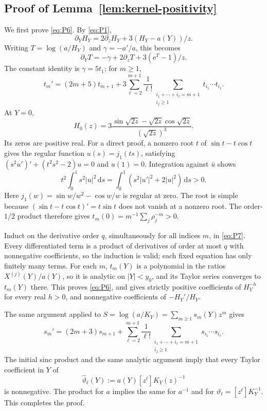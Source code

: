 \subsection{Proof of Lemma~\ref{lem:kernel-positivity}}\label{app:kernel-positivity}

We first prove \eqref{eq:P6}. By \eqref{eq:P1}, \[
 \partial_YH_Y=2\partial_zH_Y+3(H_Y-a(Y))/z.
\] Writing \(T=\log(a/H_Y)\) and \(\gamma=-a'/a\), this becomes \[
 \partial_YT=-\gamma+2\partial_zT+3(\mathrm{e}^T-1)/z.
\] The constant identity is \(\gamma=5t_1\); for \(m\ge1\), \begin{equation}
t_m'=(2m+5)t_{m+1}
  +3\sum_{\ell=2}^{m+1}\frac1{\ell!}
       \sum_{\substack{i_1+\cdots+i_\ell=m+1\\ i_j\ge1}}
          t_{i_1}\cdots t_{i_\ell}.                 \label{eq:P7}
\end{equation} At \(Y=0\), \[
 H_0(z)=3\frac{\sin\sqrt{2z}-\sqrt{2z}\cos\sqrt{2z}}
                    {(\sqrt{2z})^3}.
\] Its zeros are positive real. For a direct proof, a nonzero root \(t\)
of \(\sin t-t\cos t\) gives the regular function \(u(s)=j_1(ts)\),
satisfying \((s^2u')'+(t^2s^2-2)u=0\) and \(u(1)=0\). Integration
against \(\bar u\) shows \[
 t^2\int_0^1s^2|u|^2\,\mathrm{d}s
   =\int_0^1(s^2|u'|^2+2|u|^2)\,\mathrm{d}s>0.
\] Here \(j_1(w)=\sin w/w^2-\cos w/w\) is regular at zero. The root is
simple because \((\sin t-t\cos t)'=t\sin t\) does not vanish at a
nonzero root. The order-\(1/2\) product therefore gives
\(t_m(0)=m^{-1}\sum_j\rho_j^{-m}>0\).

Induct on the derivative order \(q\), simultaneously for all indices
\(m\), in \eqref{eq:P7}. Every differentiated term is a product of derivatives of
order at most \(q\) with nonnegative coefficients, so the induction is
valid; each fixed equation has only finitely many terms. For each \(m\),
\(t_m(Y)\) is a polynomial in the ratios \(X^{(j)}(Y)/a(Y)\), so it is
analytic on \(|Y|<y_0\), and its Taylor series converges to
\(t_m(Y)\) there. This proves \eqref{eq:P6}, and gives strictly positive
coefficients of \(H_Y^{-h}\) for every real \(h>0\), and nonnegative
coefficients of \(-H_Y'/H_Y\).

The same argument applied to \(S=\log(a/K_Y)=\sum_{m\ge1}s_m(Y)z^m\)
gives \begin{equation}
s_m'=(2m+3)s_{m+1}
  +\sum_{\ell=2}^{m+1}\frac1{\ell!}
       \sum_{\substack{i_1+\cdots+i_\ell=m+1\\ i_j\ge1}}
           s_{i_1}\cdots s_{i_\ell}.               \label{eq:P8}
\end{equation} The initial sinc product and the same analytic argument imply that
every Taylor coefficient in \(Y\) of \[
 \widehat\vartheta_\ell(Y):=a(Y)[z^\ell]K_Y(z)^{-1}
\] is nonnegative. The product for \(a\) implies the same for \(a^{-1}\)
and for \(\vartheta_\ell=[z^\ell]K_Y^{-1}\). This completes the proof.

